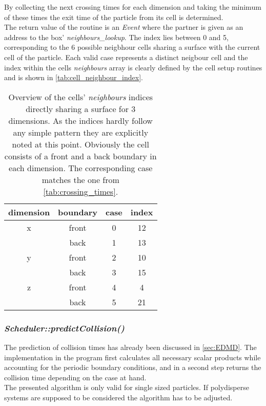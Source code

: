 By collecting the next crossing times for each dimension and taking the minimum of these times the exit time of the particle from its cell is determined.\\

The return value of the routine is an \textit{Event} where the partner is given as an address to the box' \textit{neighbours\_lookup}. The index lies between 0 and 5, corresponding to the 6 possible neigbhour cells sharing a surface with the current cell of the particle. Each valid case represents a distinct neigbour cell and the index within the cells \textit{neighbours} array is clearly defined by the cell setup routines and is shown in \autoref{tab:cell_neighbour_index}. 

\begin{table}[h]
\centering
\begin{tabular}{c|c|c|c}
dimension & boundary & case & index \\ \hline
x & front & 0 & 12 \\
 & back & 1 & 13 \\ \hline
y & front & 2 & 10 \\
 & back & 3 & 15 \\ \hline
z & front & 4 & 4 \\
 & back & 5 & 21 \\
\end{tabular}
\caption{Overview of the cells' \textit{neighbours} indices directly sharing a surface for 3 dimensions. As the indices hardly follow any simple pattern they are explicitly noted at this point. Obviously the cell consists of a front and a back boundary in each dimension. The corresponding case matches the one from \autoref{tab:crossing_times}.}
\label{tab:cell_neighbour_index}
\end{table}
\FloatBarrier

\subsubsection{\quad \textit{Scheduler::predictCollision()}}
The prediction of collision times has already been discussed in \autoref{sec:EDMD}. The implementation in the program first calculates all necessary scalar products while accounting for the periodic boundary conditions, and in a second step returns the collision time depending on the case at hand.\\

The presented algorithm is only valid for single sized particles. If polydisperse systems are supposed to be considered the algorithm has to be adjusted. \\

